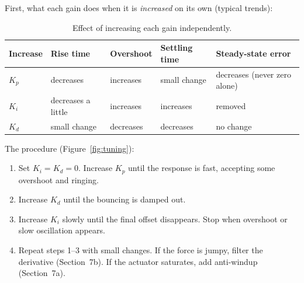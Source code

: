 \documentclass[]{article}
\begin{document}
First, what each gain does when it is \emph{increased} on its own (typical trends):

\begin{table}[h]
	\centering
	\small
	\begin{tabular}{@{}lllll@{}}
		\toprule
		Increase & Rise time & Overshoot & Settling time & Steady-state error \\
		\midrule
		$K_p$ & decreases & increases & small change & decreases (never zero alone) \\
		$K_i$ & decreases a little & increases & increases & removed \\
		$K_d$ & small change & decreases & decreases & no change \\
		\bottomrule
	\end{tabular}
	\caption{Effect of increasing each gain independently.}
\end{table}

The procedure (Figure~\ref{fig:tuning}):
\begin{enumerate}
	\item Set $K_i = K_d = 0$. Increase $K_p$ until the response is fast, accepting some overshoot and ringing.
	\item Increase $K_d$ until the bouncing is damped out.
	\item Increase $K_i$ slowly until the final offset disappears. Stop when overshoot or slow oscillation appears.
	\item Repeat steps 1--3 with small changes. If the force is jumpy, filter the derivative (Section~7b). If the actuator saturates, add anti-windup (Section~7a).
\end{enumerate}
\end{document}
